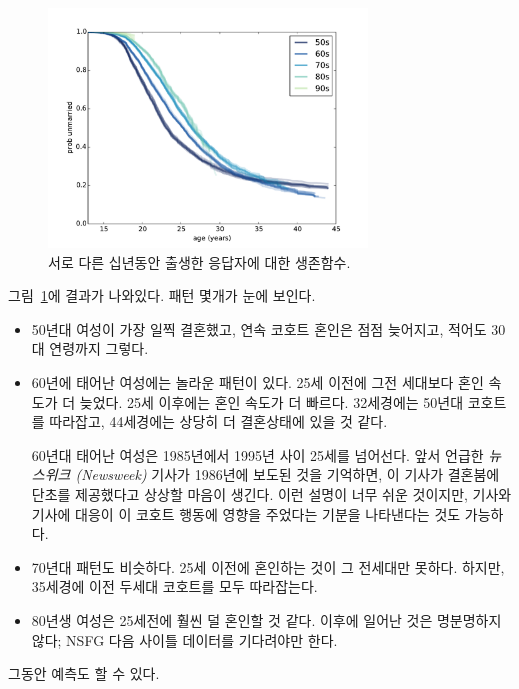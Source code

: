 \begin{figure}
\centerline{\includegraphics[height=2.5in]{figs/survival4.pdf}}
\caption{서로 다른 십년동안 출생한 응답자에 대한 생존함수.}
\label{survival4}
\end{figure}

그림~\ref{survival4}에 결과가 나와있다.
패턴 몇개가 눈에 보인다.

\begin{itemize}

\item 50년대 여성이 가장 일찍 결혼했고, 연속 코호트 혼인은 점점 늦어지고, 적어도 30대 연령까지 그렇다.

\item 60년에 태어난 여성에는 놀라운 패턴이 있다.
25세 이전에 그전 세대보다 혼인 속도가 더 늦었다. 25세 이후에는 혼인 속도가 더 빠르다. 32세경에는 50년대 코호트를 따라잡고, 44세경에는 상당히 더 결혼상태에 있을 것 같다.

60년대 태어난 여성은 1985년에서 1995년 사이 25세를 넘어선다.
앞서 언급한 {\it 뉴스위크 (Newsweek)} 기사가 1986년에 보도된 것을 기억하면, 이 기사가 결혼붐에 단초를 제공했다고 상상할 마음이 생긴다. 
이런 설명이 너무 쉬운 것이지만, 기사와 기사에 대응이 이 코호트 행동에 영향을 주었다는 기분을 나타낸다는 것도 가능하다.

\item 70년대 패턴도 비슷하다. 25세 이전에 혼인하는 것이 그 전세대만 못하다. 하지만, 35세경에 이전 두세대 코호트를 모두 따라잡는다.

\item 80년생 여성은 25세전에 훨씬 덜 혼인할 것 같다. 이후에 일어난 것은 명분명하지 않다; NSFG 다음 사이틀 데이터를 기다려야만 한다.

\end{itemize}

그동안 예측도 할 수 있다.


